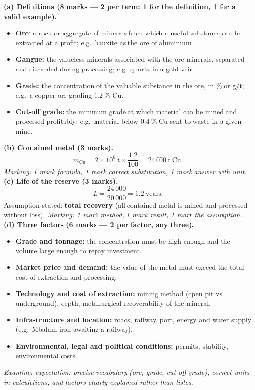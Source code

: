 \documentclass[11pt]{article}
\begin{document}
\begin{corrige}
\textbf{(a) Definitions (8 marks — 2 per term: 1 for the definition, 1 for a valid example).}
\begin{itemize}
\item \textbf{Ore:} a rock or aggregate of minerals from which a useful substance can be extracted at a profit; e.g.\ bauxite as the ore of aluminium.
\item \textbf{Gangue:} the valueless minerals associated with the ore minerals, separated and discarded during processing; e.g.\ quartz in a gold vein.
\item \textbf{Grade:} the concentration of the valuable substance in the ore, in $\%$ or $\mathrm{g/t}$; e.g.\ a copper ore grading $1.2\ \%$ Cu.
\item \textbf{Cut-off grade:} the minimum grade at which material can be mined and processed profitably; e.g.\ material below $0.4\ \%$ Cu sent to waste in a given mine.
\end{itemize}
\textbf{(b) Contained metal (3 marks).}
\[ m_{\mathrm{Cu}} = 2\times10^{6}\ \mathrm{t}\times\frac{1.2}{100} = 24\,000\ \mathrm{t\ Cu}. \]
\emph{Marking: 1 mark formula, 1 mark correct substitution, 1 mark answer with unit.}
\textbf{(c) Life of the reserve (3 marks).}
\[ L = \frac{24\,000}{20\,000} = 1.2\ \text{years}. \]
Assumption stated: \textbf{total recovery} (all contained metal is mined and processed without loss). \emph{Marking: 1 mark method, 1 mark result, 1 mark the assumption.}
\textbf{(d) Three factors (6 marks — 2 per factor, any three).}
\begin{itemize}
\item \textbf{Grade and tonnage:} the concentration must be high enough and the volume large enough to repay investment.
\item \textbf{Market price and demand:} the value of the metal must exceed the total cost of extraction and processing.
\item \textbf{Technology and cost of extraction:} mining method (open pit vs underground), depth, metallurgical recoverability of the mineral.
\item \textbf{Infrastructure and location:} roads, railway, port, energy and water supply (e.g.\ Mbalam iron awaiting a railway).
\item \textbf{Environmental, legal and political conditions:} permits, stability, environmental costs.
\end{itemize}
\emph{Examiner expectation: precise vocabulary (ore, grade, cut-off grade), correct units in calculations, and factors clearly explained rather than listed.}
\end{corrige}
\end{document}
